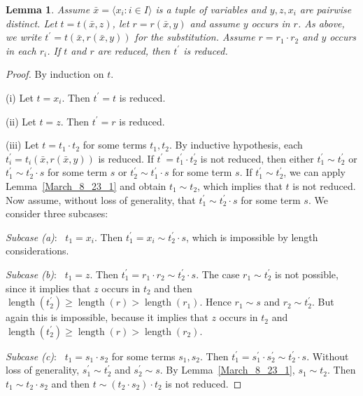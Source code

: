 \documentclass[a4paper, 11pt]{article}
\DeclareMathOperator{\len}{length}
\theoremstyle{note}
\newtheorem{lemma}[thm]{Lemma}
\begin{document}
\begin{lemma}\label{March_8_23_2} %
Assume $\bar{x}= \langle x_i : i \in I\rangle$ is a tuple of variables and  $y,z,x_i$ are pairwise distinct. Let  $t=t(\bar{x},z)$,  let $r=r(\bar{x},y)$  and assume $y$ occurs in $r$. As above, we write  $t^\prime= t(\bar{x},r(\bar{x},y))$  for the substitution. Assume $r=r_1\cdot r_2$ and $y$ occurs in each $r_i$.  If $t$ and $r$ are reduced, then $t^\prime$ is reduced.
\end{lemma}
\begin{proof} By  induction on $t$.

(i) Let $t=x_i$.  Then  $t^\prime = t$  is reduced.

(ii) Let $t=z$. Then $t^\prime = r$ is reduced.

(iii) Let $t= t_1\cdot t_2$  for some terms $t_1,t_2$. By inductive hypothesis, each  $t_i^\prime =t_i(\bar{x},r(\bar{x},y))$  is reduced.  If $t^\prime =t_1^\prime\cdot t_2^\prime$ is not reduced, then either  $t_1^\prime\sim t_2^\prime$  or  $t_1^\prime\sim t_2^\prime\cdot s$  for some term $s$  or  $t_2^\prime\sim t_1^\prime\cdot s$  for some term $s$.  If $t_1^\prime\sim t_2^\prime$, we can apply Lemma~\ref{March_8_23_1} and obtain $t_1\sim t_2$, which implies that $t$ is not reduced.  Now assume, without loss of generality, that $t_1^\prime\sim t_2^\prime\cdot s$  for some term $s$.  We consider three subcases:

\textit{Subcase (a)}: \ $t_1=x_i$. Then  $t_1^\prime = x_i\sim t_2^\prime\cdot s$, which is impossible by length considerations.

\textit{Subcase (b)}: \ $t_1 = z$.  Then $t_1^\prime=r_1\cdot r_2\sim t_2^\prime\cdot s$. The case  $r_1\sim t_2^\prime$  is not possible, since  it implies that $z$ occurs in $t_2$ and then $\len(t_2^\prime)\geq \len (r)>\len(r_1)$. Hence  $r_1\sim s$ and $r_2\sim t_2^\prime$.  But again this is impossible, because it implies that $z$ occurs in $t_2$ and $\len(t_2^\prime)\geq \len(r)>\len(r_2)$.

\textit{Subcase (c)}: \  $t_1= s_1\cdot s_2$  for some terms $s_1,s_2$. Then $t_1^\prime=s_1^\prime\cdot s_2^\prime\sim t_2^\prime\cdot s$. Without loss of generality, $s_1^\prime\sim t_2^\prime$ and $s_2^\prime\sim s$. By  Lemma~\ref{March_8_23_1}, $s_1\sim t_2$. Then $t_1\sim t_2\cdot s_2$  and then  $t\sim (t_2\cdot s_2)\cdot t_2$  is not reduced.
\end{proof}
\end{document}
